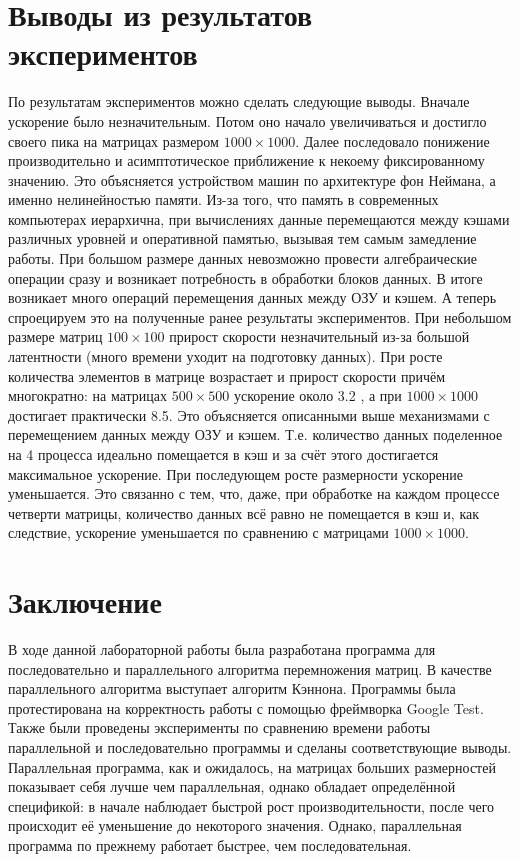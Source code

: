\documentclass[12pt, letterpaper]{article}
\begin{document}
\section*{Выводы из результатов экспериментов}
По результатам экспериментов можно сделать следующие выводы. Вначале ускорение было незначительным. Потом оно начало увеличиваться и достигло своего пика на матрицах размером $1000\times 1000$. Далее последовало понижение производительно и асимптотическое приближение к некоему фиксированному значению. Это объясняется устройством машин по архитектуре фон Неймана, а именно нелинейностью памяти. Из-за того, что память в современных компьютерах иерархична, при вычислениях данные перемещаются между кэшами различных уровней и оперативной памятью, вызывая тем самым замедление работы. При большом размере данных невозможно провести алгебраические операции сразу и возникает потребность в обработки блоков данных. В итоге возникает много операций перемещения данных между ОЗУ и кэшем. А теперь спроецируем это на полученные ранее результаты экспериментов. При небольшом размере матриц $100\times 100$ прирост скорости незначительный из-за большой латентности (много времени уходит на подготовку данных). При росте количества элементов в матрице возрастает и прирост скорости причём многократно: на матрицах $500\times500$  ускорение около 3.2 , а при $1000\times 1000$ достигает практически 8.5. Это объясняется описанными выше механизмами с перемещением данных между ОЗУ и кэшем. Т.е. количество данных поделенное на 4 процесса идеально помещается в кэш и за счёт этого достигается максимальное ускорение. При последующем росте размерности ускорение уменьшается. Это связанно с тем, что, даже, при обработке на каждом процессе четверти матрицы, количество данных всё равно не помещается в кэш и, как следствие, ускорение уменьшается по сравнению с матрицами $1000\times 1000$.
\newpage

\section*{Заключение}
В ходе данной лабораторной работы была разработана программа для последовательно и параллельного алгоритма перемножения матриц. В качестве параллельного алгоритма выступает алгоритм Кэннона. Программы была протестирована на корректность работы с помощью фреймворка Google Test. Также были проведены эксперименты по сравнению времени работы параллельной и последовательно программы и сделаны соответствующие выводы. Параллельная программа, как и ожидалось, на матрицах больших размерностей показывает себя лучше чем параллельная, однако обладает определённой спецификой: в начале наблюдает быстрой рост производительности, после чего происходит её уменьшение до некоторого значения. Однако, параллельная программа по прежнему работает быстрее, чем последовательная. 
\newpage
\end{document}
